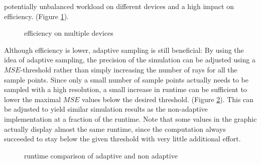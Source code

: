potentially unbalanced workload on different devices and a high impact on efficiency.
(Figure \ref{plot:gpu_scaling}).
\begin{figure}[H]
  \centerline{
    }
  \caption{efficiency on multiple devices}
  \label{plot:gpu_scaling}
\end{figure}
Although efficiency is lower, adaptive sampling is still beneficial: By using
the idea of adaptive sampling, the precision of the simulation can be adjusted
using a $MSE$-threshold rather than simply increasing the number of rays for all
the sample points. Since only a small number of sample points actually needs to
be sampled with a high resolution, a small increase in runtime can be sufficient
to lower the maximal $MSE$ values below the desired threshold. (Figure
\ref{plot:adaptive_runtime}). This can be adjusted to yield similar simulation
results as the non-adaptive implementation at a fraction of the runtime. Note
that some values in the graphic actually display almost the same runtime, since
the computation always succeeded to stay below the given threshold with very
little additional effort.
\begin{figure}[H]
  \centerline{
    }
  \caption{runtime comparison of adaptive and non adaptive }
  \label{plot:adaptive_runtime}
\end{figure}
